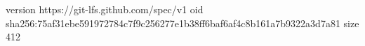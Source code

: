 version https://git-lfs.github.com/spec/v1
oid sha256:75af31ebe591972784c7f9c256277e1b38ff6baf6af4c8b161a7b9322a3d7a81
size 412
